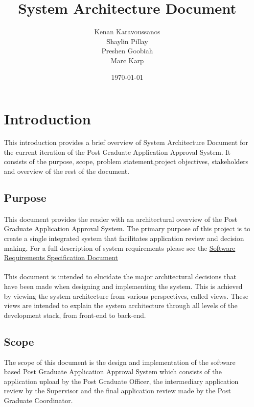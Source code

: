 \documentclass[11pt]{article}
\title{ System Architecture Document}
\author{ Kenan Karavoussanos \\ Shaylin Pillay \\ Preshen Goobiah \\ Marc Karp}
\date{\today}
\begin{document}
\maketitle

\tableofcontents

%
\newpage
\section{Introduction}
This introduction provides a brief overview of System Architecture Document for the current iteration of the Post Graduate Application Approval System. It consists of the purpose, scope, problem statement,project objectives, stakeholders and overview of the rest of the document.
\subsection{Purpose}
\paragraph{}This document provides the reader with an architectural overview of the Post Graduate Application Approval System. The primary purpose of this project is to create a single integrated system that facilitates application review and decision making. For a full description of system requirements please see the \href{https://github.com/KenanKarav/}{Software Requirements Specification Document}

\paragraph{}This document is intended to elucidate the major architectural decisions that have been made when designing and implementing the system. This is achieved by viewing the system architecture from various perspectives, called views. These views are intended to explain the system architecture through all levels of the development stack, from front-end to back-end.


\subsection{Scope}
The scope of this document is the design and implementation of the software based Post Graduate Application Approval System which consists of the application upload by the Post Graduate Officer, the intermediary application review by the Supervisor and the final application review made by the Post Graduate Coordinator.
\end{document}
